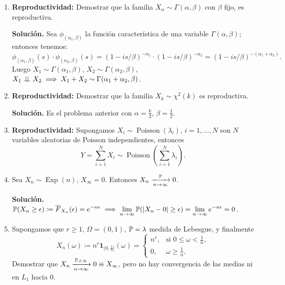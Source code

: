 \begin{enumerate}
  \textbf{Solución.} Tenemos $X_i^2 \stackrel{\text{i.i.d.}}{\sim} \chi^2(1)$. Por tanto:
  \[
    \phi_Y(s) = \phi_{X_1^2}(s) \cdots \phi_{X_n^2}(s) = \left(\frac{1}{\sqrt{1 - 2is}}\right)^n = (1 - 2is)^{-n/2}.
  \]

  \item \textbf{Reproductividad:} Demostrar que la familia $X_\alpha \sim \Gamma(\alpha, \beta)$ con $\beta$ fijo, es reproductiva.

  \textbf{Solución.} Sea $\phi_{(\alpha_1, \beta)}$ la función característica de una variable $\Gamma(\alpha, \beta)$; entonces tenemos:
  \[
    \phi_{(\alpha_1, \beta)}(s) \cdot \phi_{(\alpha_2, \beta)}(s) = (1 - is/\beta)^{-\alpha_1} \cdot (1 - is/\beta)^{-\alpha_2} = (1 - is/\beta)^{-(\alpha_1 + \alpha_2)}.
  \]
  Luego $X_1 \sim \Gamma(\alpha_1, \beta)$, $X_2 \sim \Gamma(\alpha_2, \beta)$, $X_1 \perp\!\!\!\perp X_2 \implies X_1 + X_2 \sim \Gamma(\alpha_1 + \alpha_2, \beta)$.

  \item \textbf{Reproductividad:} Demostrar que la familia $X_k \sim \chi^2(k)$ es reproductiva.

  \textbf{Solución.} Es el problema anterior con $\alpha = \frac{k}{2}$, $\beta = \frac{1}{2}$.

  \item \textbf{Reproductividad:} Supongamos $X_i \sim \operatorname{Poisson}(\lambda_i)$, $i=1,\dots,N$ son $N$ variables aleatorias de Poisson independientes, entonces
        \[
          Y = \sum_{i=1}^N X_i \sim \operatorname{Poisson}\!\left(\sum_{i=1}^N \lambda_i\right).
        \]

  \item Sea $X_n \sim \operatorname{Exp}(n)$, $X_\infty = 0$. Entonces $X_n \xrightarrow[n\to\infty]{\mathbb{P}} 0$.

  \textbf{Solución.} $\displaystyle \mathbb{P}(X_n \ge \epsilon) \coloneqq \overline{F}_{X_n}(\epsilon) = e^{-n\epsilon} \implies \lim_{n\to\infty} \mathbb{P}(|X_n - 0| \ge \epsilon) = \lim_{n\to\infty} e^{-n\epsilon} = 0$.

  \item Supongamos que $r \ge 1$, $\Omega = (0,1)$, $\mathbb{P} = \lambda$ medida de Lebesgue, y finalmente
        \[
          X_n(\omega) \coloneqq n^r \mathbf{1}_{(0, \frac{1}{n}]}(\omega) =
          \begin{cases}
            n^r, & \text{si } 0 \le \omega < \frac{1}{n}, \\
            0, & \omega \ge \frac{1}{n}.
          \end{cases}
        \]
        Demostrar que $X_n \xrightarrow[n\to\infty]{\mathbb{P}, \text{c.s.}} 0 \equiv X_\infty$, pero no hay convergencia de las medias ni en $L_1$ hacia $0$.


\end{enumerate}

